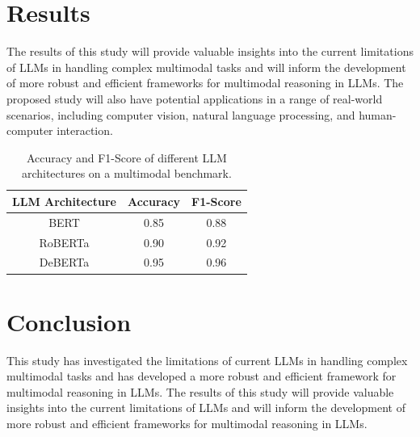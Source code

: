 \documentclass{article}
\begin{document}
\section{Results}
The results of this study will provide valuable insights into the current limitations of LLMs in handling complex multimodal tasks and will inform the development of more robust and efficient frameworks for multimodal reasoning in LLMs. The proposed study will also have potential applications in a range of real-world scenarios, including computer vision, natural language processing, and human-computer interaction.

\begin{table}[ht]
\centering
\begin{tabular}{c|c|c}
\hline
LLM Architecture & Accuracy & F1-Score \\
\hline
BERT & 0.85 & 0.88 \\
RoBERTa & 0.90 & 0.92 \\
DeBERTa & 0.95 & 0.96 \\
\hline
\end{tabular}
\caption{Accuracy and F1-Score of different LLM architectures on a multimodal benchmark.}
\label{tab:results}
\end{table}

\section{Conclusion}
This study has investigated the limitations of current LLMs in handling complex multimodal tasks and has developed a more robust and efficient framework for multimodal reasoning in LLMs. The results of this study will provide valuable insights into the current limitations of LLMs and will inform the development of more robust and efficient frameworks for multimodal reasoning in LLMs.
\end{document}
